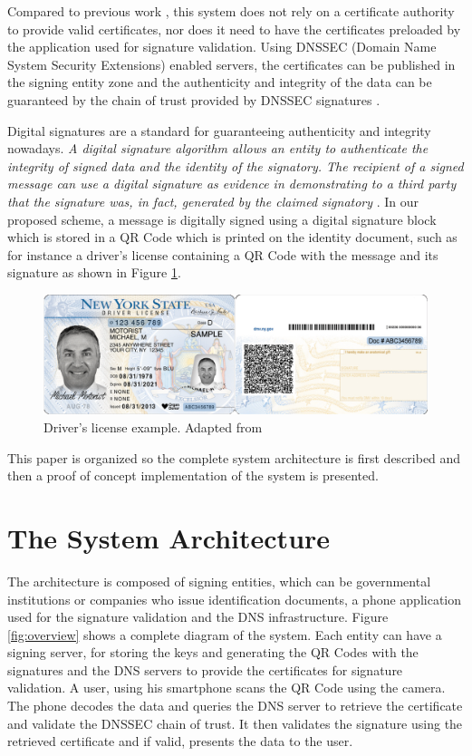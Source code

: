 \documentclass[12pt]{article}
\begin{document}
Compared to previous work \cite{warasart2012based}, this system does not rely on a certificate authority to provide valid certificates, nor does it need to have the certificates preloaded by the application used for signature validation. Using DNSSEC (Domain Name System Security Extensions) enabled servers, the certificates can be published in the signing entity zone and the authenticity and integrity of the data can be guaranteed by the chain of trust provided by DNSSEC signatures \cite{arends2005dns}. 

Digital signatures are a standard for guaranteeing authenticity and integrity nowadays. \emph{A digital signature algorithm allows an entity to authenticate the integrity of signed data and the identity of the signatory. The recipient of a signed message can use a digital
signature as evidence in demonstrating to a third party that the signature was, in fact, generated by the claimed signatory} \cite{fips2013186}. In our proposed scheme, a message is digitally signed using a digital signature block which is stored in a QR Code which is printed on the identity document, such as for instance a driver's license containing a QR Code with the message and its signature as shown in Figure \ref{fig:license}.

\begin{figure}[ht]
    \centering
    \includegraphics[width=1\textwidth]{license.png}
    \caption{Driver's license example. Adapted from \cite{new_sample_2013}}
    \label{fig:license}
\end{figure}

This paper is organized so the complete system architecture is first described and then a proof of concept implementation of the system is presented.

\section{The System Architecture}

The architecture is composed of signing entities, which can be governmental institutions or companies who issue identification documents, a phone application used for the signature validation and the DNS infrastructure. Figure \ref{fig:overview} shows a complete diagram of the system. Each entity can have a signing server, for storing the keys and generating the QR Codes with the signatures and the DNS servers to provide the certificates for signature validation. A user, using his smartphone scans the QR Code using the camera. The phone decodes the data and queries the DNS server to retrieve the certificate and validate the DNSSEC chain of trust. It then validates the signature using the retrieved certificate and if valid, presents the data to the user.
\end{document}
